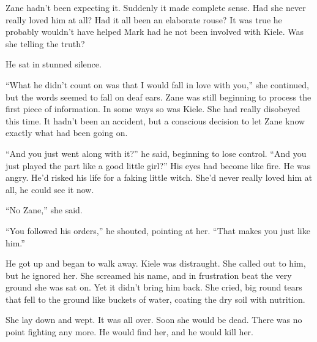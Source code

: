 Zane hadn't been expecting it.  Suddenly it made complete sense.  Had she never really loved him at all?  Had it all been an elaborate rouse?  It was true he probably wouldn't have helped Mark had he not been involved with Kiele.  Was she telling the truth?

He sat in stunned silence.

``What he didn't count on was that I would fall in love with you,'' she continued, but the words seemed to fall on deaf ears.  Zane was still beginning to process the first piece of information.  In some ways so was Kiele.  She had really disobeyed this time.  It hadn't been an accident, but a conscious decision to let Zane know exactly what had been going on.

``And you just went along with it?'' he said, beginning to lose control.  ``And you just played the part like a good little girl?''  His eyes had become like fire.  He was angry.  He'd risked his life for a faking little witch.  She'd never really loved him at all, he could see it now.

``No Zane,'' she said.

``You followed his orders,'' he shouted, pointing at her.  ``That makes you just like him.''

He got up and began to walk away.  Kiele was distraught.  She called out to him, but he ignored her.  She screamed his name, and in frustration beat the very ground she was sat on.  Yet it didn't bring him back.  She cried, big round tears that fell to the ground like buckets of water, coating the dry soil with nutrition.

She lay down and wept.  It was all over.  Soon she would be dead.  There was no point fighting any more.  He would find her, and he would kill her.

